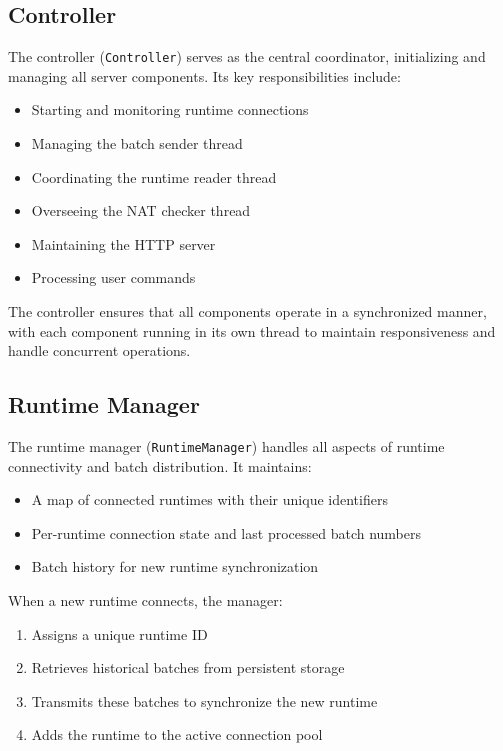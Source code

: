 \documentclass[10pt]{IEEEtran}
\begin{document}
\subsection{Controller}

The controller (\texttt{Controller}) serves as the central coordinator, initializing and managing all server components. Its key responsibilities include:

\begin{itemize}
    \item Starting and monitoring runtime connections
    \item Managing the batch sender thread
    \item Coordinating the runtime reader thread
    \item Overseeing the NAT checker thread
    \item Maintaining the HTTP server
    \item Processing user commands
\end{itemize}

The controller ensures that all components operate in a synchronized manner, with each component running in its own thread to maintain responsiveness and handle concurrent operations.

\subsection{Runtime Manager}

The runtime manager (\texttt{RuntimeManager}) handles all aspects of runtime connectivity and batch distribution. It maintains:

\begin{itemize}
    \item A map of connected runtimes with their unique identifiers
    \item Per-runtime connection state and last processed batch numbers
    \item Batch history for new runtime synchronization
\end{itemize}

When a new runtime connects, the manager:
\begin{enumerate}
    \item Assigns a unique runtime ID
    \item Retrieves historical batches from persistent storage
    \item Transmits these batches to synchronize the new runtime
    \item Adds the runtime to the active connection pool
\end{enumerate}
\end{document}
